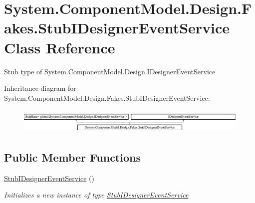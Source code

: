 \hypertarget{class_system_1_1_component_model_1_1_design_1_1_fakes_1_1_stub_i_designer_event_service}{\section{System.\-Component\-Model.\-Design.\-Fakes.\-Stub\-I\-Designer\-Event\-Service Class Reference}
\label{class_system_1_1_component_model_1_1_design_1_1_fakes_1_1_stub_i_designer_event_service}
}


Stub type of System.\-Component\-Model.\-Design.\-I\-Designer\-Event\-Service 


Inheritance diagram for System.\-Component\-Model.\-Design.\-Fakes.\-Stub\-I\-Designer\-Event\-Service\-:\begin{figure}[H]
\begin{center}
\leavevmode
\includegraphics[height=1.233480cm]{class_system_1_1_component_model_1_1_design_1_1_fakes_1_1_stub_i_designer_event_service}
\end{center}
\end{figure}
\subsection*{Public Member Functions}
\begin{DoxyCompactItemize}
\item 
\hyperlink{class_system_1_1_component_model_1_1_design_1_1_fakes_1_1_stub_i_designer_event_service_a50cf6e294369152a4f364a4ecfd7231e}{Stub\-I\-Designer\-Event\-Service} ()
\begin{DoxyCompactList}\small\item\em Initializes a new instance of type \hyperlink{class_system_1_1_component_model_1_1_design_1_1_fakes_1_1_stub_i_designer_event_service}{Stub\-I\-Designer\-Event\-Service}\end{DoxyCompactList}\end{DoxyCompactItemize}
